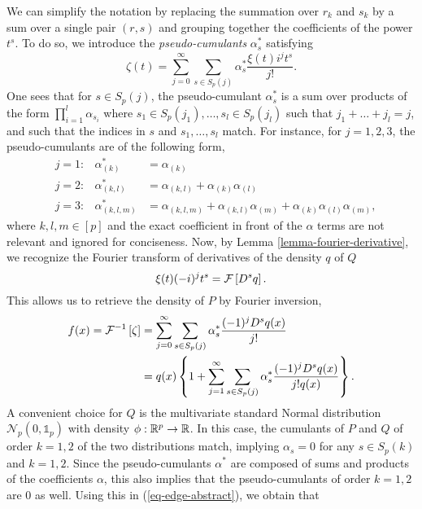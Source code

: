 We can simplify the notation by replacing the summation over $r_k$ and $s_k$ by a sum over a single pair $(r, s)$ and grouping together the coefficients of the power $t^s$. To do so, we introduce the \textit{pseudo-cumulants} $\alpha^*_s$ satisfying
\begin{equation} \label{eq-char-expansion}
    \zeta(t) = 
    \sum_{j=0}^\infty 
    \sum_{s \in S_p(j)}
    \alpha^*_s \frac{\xi(t) i^{j} t^{s}}{j!}.
\end{equation}
One sees that for $s \in S_p(j)$, the pseudo-cumulant $\alpha^*_s$ is a sum over products of the form $ \prod_{i=1}^l \alpha_{s_i}$ where $s_1 \in S_p(j_1), \ldots, s_l \in S_p(j_l)$ such that $j_1 + \ldots + j_l = j$, and such that the indices in $s$ and $s_1, \ldots, s_l$ match. For instance, for $j = 1, 2, 3$, the pseudo-cumulants are of the following form,
\begin{align*}
    &j = 1:& \alpha^*_{(k)} &= \alpha_{(k)} \\
    &j = 2:&\alpha^*_{(k, l)} &= \alpha_{(k, l)} + \alpha_{(k)}\alpha_{(l)}\\
    &j = 3:&\alpha^*_{(k, l, m)} &= \alpha_{(k, l, m)} + \alpha_{(k, l)}\alpha_{(m)} + \alpha_{(k)}\alpha_{(l)}\alpha_{(m)},
\end{align*}
where $k,l,m \in [p]$ and the exact coefficient in front of the $\alpha$ terms are not relevant and ignored for conciseness. Now, by Lemma \ref{lemma-fourier-derivative}, we recognize the Fourier transform of derivatives of the density $q$ of $Q$
\begin{equation*}
    \xi(t) (-i)^{j} t^s  = \mathcal{F} \left[ D^s q \right].
\end{equation*}
This allows us to retrieve the density of $P$ by Fourier inversion,
\begin{align}\label{eq-edge-abstract}
    f(x) = \mathcal{F}^{-1}\left[\zeta\right] &= 
    \sum_{j=0}^\infty 
    \sum_{s \in S_p(j)}
    \alpha^*_s \frac{(-1)^j D^s q(x)}{j!}\nonumber\\
    &= 
    q(x) \left\{ 1 + \sum_{j=1}^\infty 
    \sum_{s \in S_p(j)}
    \alpha^*_s \frac{(-1)^j D^s q(x)}{j! q(x)}\right\}.
\end{align}
A convenient choice for $Q$ is the multivariate standard Normal distribution $\mathcal{N}_p(0, \mathbb{1}_p)$ with density $\phi : {\mathbb{R}^p} \rightarrow \mathbb{R}$. In this case, the cumulants of $P$ and $Q$ of order $k=1,2$ of the two distributions match, implying $\alpha_s = 0$ for any $s \in S_p(k)$ and $k=1,2$. Since the pseudo-cumulants $\alpha^*$ are composed of sums and products of the coefficients $\alpha$, this also implies that the pseudo-cumulants of order $k=1,2$ are 0 as well. Using this in (\ref{eq-edge-abstract}), we obtain that
